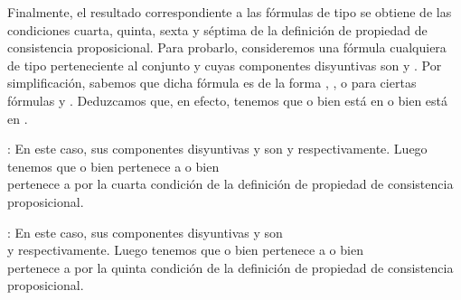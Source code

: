 \begin{isabellebody}
\begin{isamarkuptext}
\begin{demostracion}
  Finalmente, el resultado correspondiente a las fórmulas de tipo \isa{{\isasymbeta}} se obtiene de las 
  condiciones cuarta, quinta, sexta y séptima de la definición de propiedad de consistencia 
  proposicional. Para probarlo, consideremos una fórmula cualquiera de tipo \isa{{\isasymbeta}} perteneciente
  al conjunto  y cuyas componentes disyuntivas son  y . Por simplificación, sabemos 
  que dicha fórmula es de la forma , ,  o  para ciertas 
  fórmulas  y . Deduzcamos que, en efecto, tenemos que o bien  está en  o bien 
   está en .

  : En este caso, sus componentes disyuntivas  y  son  y 
     respectivamente. Luego tenemos que o bien   pertenece a  o bien\\
     pertenece a  por la cuarta condición de la definición de propiedad de 
    consistencia proposicional.

  : En este caso, sus componentes disyuntivas  y  son\\ 
     y  respectivamente. Luego tenemos que o bien   pertenece a  o 
    bien\\  pertenece a  por la quinta condición de la definición de propiedad 
    de consistencia proposicional.


\end{demostracion}
\end{isamarkuptext}
\end{isabellebody}
